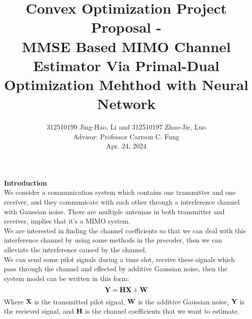 \documentclass[a4paper, onecolumn, , 11pt]{IEEEtran}
\begin{document}


    \title{ Convex Optimization Project Proposal -\\
    \huge  MMSE Based MIMO Channel Estimator Via Primal-Dual
    Optimization Mehthod with Neural Network}
    \author{312510199 Jing-Hao, Li and 312510197 Zhao-Jie, Luo\\
        Advisor: Professor Carrson C. Fung\\
        \small{Apr. 24, 2024}}


    \maketitle





    \noindent \textbf{Introduction}\\
        We consider a communication system which contains one transmitter and one receiver, and they communicate with each other through a interference channel with 
        Gaussian noise. There are multiple antennas in both transmitter and receiver, implies that it's a MIMO system.\\
        We are interested in finding the channel coefficients so that we can deal with this interference channel by using some methods in the precoder, then we
        can alleviate the interference caused by the channel. \\
        We can send some pilot signals during a time slot, receive these signals which pass through the channel and effected by additive Gaussian noise, 
        then the system model can be written in this form:
        $${\bf Y} = {\bf H}{\bf X} + {\bf W}$$
        Where ${\bf X}$ is the transmitted pilot signal, ${\bf W}$ is the additive Gaussian noise, ${\bf Y}$ is the recieved signal, and ${\bf H}$ is the channel coefficients
        that we want to estimate.\\
\end{document}
